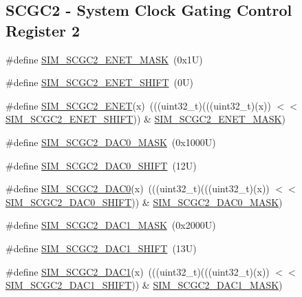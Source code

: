 \subsection*{S\+C\+G\+C2 -\/ System Clock Gating Control Register 2}
\begin{DoxyCompactItemize}
\item 
\#define \mbox{\hyperlink{group___s_i_m___register___masks_ga3f20582508f2269362192a109137d387}{S\+I\+M\+\_\+\+S\+C\+G\+C2\+\_\+\+E\+N\+E\+T\+\_\+\+M\+A\+SK}}~(0x1\+U)
\item 
\#define \mbox{\hyperlink{group___s_i_m___register___masks_ga62d37ca0d03946832d5645692545a817}{S\+I\+M\+\_\+\+S\+C\+G\+C2\+\_\+\+E\+N\+E\+T\+\_\+\+S\+H\+I\+FT}}~(0\+U)
\item 
\#define \mbox{\hyperlink{group___s_i_m___register___masks_ga1a66d81137e5952a94d154f9837fcc32}{S\+I\+M\+\_\+\+S\+C\+G\+C2\+\_\+\+E\+N\+ET}}(x)~(((uint32\+\_\+t)(((uint32\+\_\+t)(x)) $<$$<$ \mbox{\hyperlink{group___s_i_m___register___masks_ga62d37ca0d03946832d5645692545a817}{S\+I\+M\+\_\+\+S\+C\+G\+C2\+\_\+\+E\+N\+E\+T\+\_\+\+S\+H\+I\+FT}})) \& \mbox{\hyperlink{group___s_i_m___register___masks_ga3f20582508f2269362192a109137d387}{S\+I\+M\+\_\+\+S\+C\+G\+C2\+\_\+\+E\+N\+E\+T\+\_\+\+M\+A\+SK}})
\item 
\#define \mbox{\hyperlink{group___s_i_m___register___masks_gaa2ff8b125be9c2ba5100d9764d43ad90}{S\+I\+M\+\_\+\+S\+C\+G\+C2\+\_\+\+D\+A\+C0\+\_\+\+M\+A\+SK}}~(0x1000\+U)
\item 
\#define \mbox{\hyperlink{group___s_i_m___register___masks_gaae3b27d52cfc735e1bdb66bff969acec}{S\+I\+M\+\_\+\+S\+C\+G\+C2\+\_\+\+D\+A\+C0\+\_\+\+S\+H\+I\+FT}}~(12\+U)
\item 
\#define \mbox{\hyperlink{group___s_i_m___register___masks_ga8d31de6b8a7ae599bdcab700126aa80a}{S\+I\+M\+\_\+\+S\+C\+G\+C2\+\_\+\+D\+A\+C0}}(x)~(((uint32\+\_\+t)(((uint32\+\_\+t)(x)) $<$$<$ \mbox{\hyperlink{group___s_i_m___register___masks_gaae3b27d52cfc735e1bdb66bff969acec}{S\+I\+M\+\_\+\+S\+C\+G\+C2\+\_\+\+D\+A\+C0\+\_\+\+S\+H\+I\+FT}})) \& \mbox{\hyperlink{group___s_i_m___register___masks_gaa2ff8b125be9c2ba5100d9764d43ad90}{S\+I\+M\+\_\+\+S\+C\+G\+C2\+\_\+\+D\+A\+C0\+\_\+\+M\+A\+SK}})
\item 
\#define \mbox{\hyperlink{group___s_i_m___register___masks_ga0eb5afe8f10a57c76d6a8d6dccadf171}{S\+I\+M\+\_\+\+S\+C\+G\+C2\+\_\+\+D\+A\+C1\+\_\+\+M\+A\+SK}}~(0x2000\+U)
\item 
\#define \mbox{\hyperlink{group___s_i_m___register___masks_ga3a5d82ec75bcae51f4904dc94148a675}{S\+I\+M\+\_\+\+S\+C\+G\+C2\+\_\+\+D\+A\+C1\+\_\+\+S\+H\+I\+FT}}~(13\+U)
\item 
\#define \mbox{\hyperlink{group___s_i_m___register___masks_ga0c62d93c733443694979c246ebb7ba8b}{S\+I\+M\+\_\+\+S\+C\+G\+C2\+\_\+\+D\+A\+C1}}(x)~(((uint32\+\_\+t)(((uint32\+\_\+t)(x)) $<$$<$ \mbox{\hyperlink{group___s_i_m___register___masks_ga3a5d82ec75bcae51f4904dc94148a675}{S\+I\+M\+\_\+\+S\+C\+G\+C2\+\_\+\+D\+A\+C1\+\_\+\+S\+H\+I\+FT}})) \& \mbox{\hyperlink{group___s_i_m___register___masks_ga0eb5afe8f10a57c76d6a8d6dccadf171}{S\+I\+M\+\_\+\+S\+C\+G\+C2\+\_\+\+D\+A\+C1\+\_\+\+M\+A\+SK}})
\end{DoxyCompactItemize}
